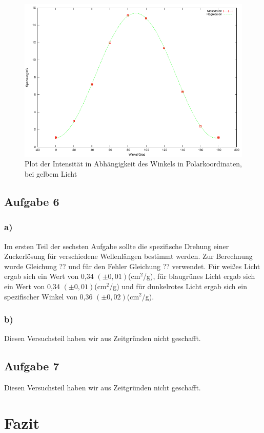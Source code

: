\documentclass[12pt]{scrartcl}
\begin{document}
\begin{figure}[H]
\centering
    \includegraphics[scale = 1]{a_5_d.pdf}
  	\caption[Plot der Intensität in Abhängigkeit des Winkels in Polarkoordinaten, bei gelbem Licht]{Plot der Intensität in Abhängigkeit des Winkels in Polarkoordinaten, bei gelbem Licht}
  \label{fig:a_5_d}
\end{figure}


\subsection{Aufgabe 6}

\subsubsection{a)}
Im ersten Teil der sechsten Aufgabe sollte die spezifische Drehung einer Zuckerlösung für verschiedene Wellenlängen bestimmt werden. Zur Berechnung wurde Gleichung ?? und für den Fehler Gleichung ?? verwendet. Für weißes Licht ergab sich ein Wert von 0,34 $(\pm 0,01)$(cm$^2$/g), für blaugrünes Licht ergab sich ein Wert von 0,34 $(\pm 0,01)$(cm$^2$/g) und für dunkelrotes Licht ergab sich ein spezifischer Winkel von 0,36 $(\pm 0,02)$(cm$^2$/g).

\subsubsection{b)}
Diesen Versuchsteil haben wir aus Zeitgründen nicht geschafft.

\subsection{Aufgabe 7}
Diesen Versuchsteil haben wir aus Zeitgründen nicht geschafft.



\section{Fazit}


\end{document}
